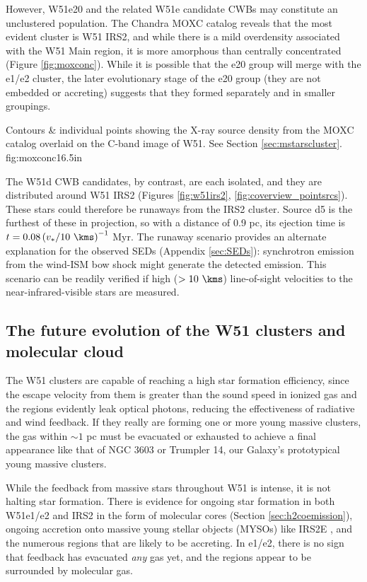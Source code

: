 However, W51e20 and the related W51e candidate CWBs may constitute an
unclustered population.  The Chandra MOXC catalog \citep{Townsley2014a} reveals
that the most evident cluster is W51 IRS2, and while there is a mild
overdensity associated with the W51 Main region, it is more amorphous than
centrally concentrated (Figure \ref{fig:moxconc}).  While it is possible that
the e20 group will merge with the e1/e2 cluster, the later evolutionary stage
of the e20 group (they are not embedded or accreting) suggests that they formed
separately and in smaller groupings.

{Contours \& individual points showing the X-ray source density from the 
MOXC \citep{Townsley2014a} catalog overlaid on the C-band image of W51.
See Section \ref{sec:mstarscluster}.}
{fig:moxconc}{1}{6.5in}

The W51d CWB candidates, by contrast, are each isolated, and they are
distributed around W51 IRS2 (Figures \ref{fig:w51irs2},
\ref{fig:coverview_pointsrcs}).  These stars could therefore be runaways from
the IRS2 cluster.  Source d5 is the furthest of these in projection, so with a
distance of 0.9 pc, its ejection time is $t = 0.08 \left({v_*}/{10
~\kms}\right)^{-1}$ Myr.  The runaway scenario provides an alternate
explanation for the observed SEDs (Appendix \ref{sec:SEDs}): synchrotron
emission from the wind-ISM bow shock might generate the detected emission.
This scenario can be readily verified if high ($>10~\kms$) line-of-sight
velocities to the near-infrared-visible stars are measured.


\subsection{The future evolution of the W51 clusters and molecular cloud}
The W51 clusters are capable of reaching a high star formation efficiency,
since the escape velocity from them is greater than the sound speed in ionized gas
\citep{Matzner2002a,Ginsburg2012a,Bressert2012a,Dale2014a} and
the \hii regions evidently leak optical photons, reducing the effectiveness of
radiative and wind feedback.  If they really are
forming one or more
young massive clusters, the gas within $\sim 1$ pc must be evacuated or
exhausted to achieve a final appearance like that of NGC 3603 or Trumpler 14,
our Galaxy's prototypical young massive clusters.


While the feedback from massive stars throughout W51 is intense, it is not
halting star formation.  There is evidence for ongoing star formation in both
W51e1/e2 and IRS2 in the form of molecular cores (Section
\ref{sec:h2coemission}), ongoing accretion onto massive young stellar objects
(MYSOs) like IRS2E \citep{Figueredo2008a}, and the numerous \hchii regions
that are likely to be accreting.  In e1/e2, there is no sign that feedback
has evacuated \emph{any} gas yet, and the \hii regions appear to be surrounded
by molecular gas.

